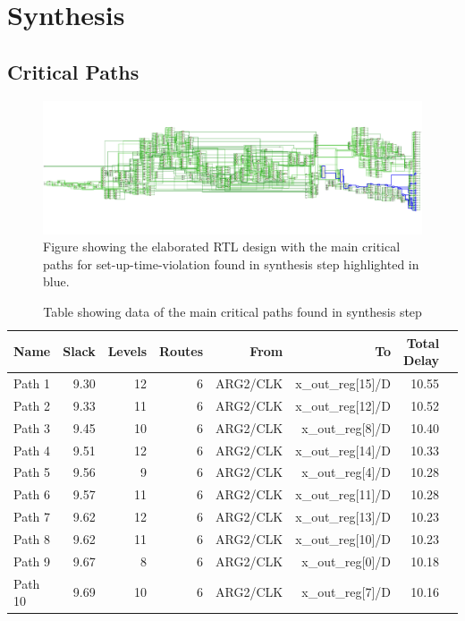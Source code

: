 \section{Synthesis}
\subsection{Critical Paths}
\begin{figure}[H]
    \centering
    \includegraphics[width=\textwidth]{./images/Vivado/setup_synthesis.pdf}
    \caption{Figure showing the elaborated RTL design with the main critical paths for set-up-time-violation found in synthesis step highlighted in blue.}
    \label{fig:setup_synthesis}
\end{figure}

\begin{table}[H]
    \centering
    \small
    \captionsetup{skip=10pt} 
    \begin{tabular}{lrrrrrrr}
        \hline
        Name &  Slack &  Levels &  Routes & From      & To                 & Total Delay    \\
        \hline
        Path 1 &   9.30 &      12 &       6 & ARG2/CLK  & x\_out\_reg[15]/D  &        10.55  \\
        Path 2 &   9.33 &      11 &       6 & ARG2/CLK  & x\_out\_reg[12]/D  &        10.52  \\
        Path 3 &   9.45 &      10 &       6 & ARG2/CLK  &  x\_out\_reg[8]/D  &        10.40  \\
        Path 4 &   9.51 &      12 &       6 & ARG2/CLK  & x\_out\_reg[14]/D  &        10.33  \\
        Path 5 &   9.56 &       9 &       6 & ARG2/CLK  &  x\_out\_reg[4]/D  &        10.28  \\
        Path 6 &   9.57 &      11 &       6 & ARG2/CLK  & x\_out\_reg[11]/D  &        10.28  \\
        Path 7 &   9.62 &      12 &       6 & ARG2/CLK  & x\_out\_reg[13]/D  &        10.23  \\
        Path 8 &   9.62 &      11 &       6 & ARG2/CLK  & x\_out\_reg[10]/D  &        10.23  \\
        Path 9 &   9.67 &       8 &       6 & ARG2/CLK  &  x\_out\_reg[0]/D  &        10.18  \\
        Path 10 &   9.69 &      10 &       6 & ARG2/CLK  &  x\_out\_reg[7]/D  &       10.16  \\
        \hline
    \end{tabular}
    \caption{Table showing data of the main critical paths found in synthesis step}
    \label{tab:setup_synthesis}
\end{table}
    
